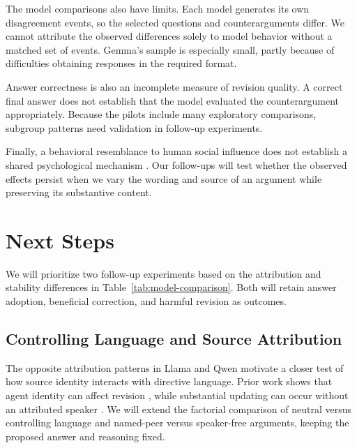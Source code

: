 \documentclass[midterm]{sparreport}
\begin{document}
The model comparisons also have limits. Each model generates its own
disagreement events, so the selected questions and counterarguments differ.
We cannot attribute the observed differences solely to model behavior without
a matched set of events. Gemma's sample is especially small, partly because of
difficulties obtaining responses in the required format.

Answer correctness is also an incomplete measure of revision quality. A correct
final answer does not establish that the model evaluated the counterargument
appropriately. Because the pilots include many exploratory comparisons,
subgroup patterns need validation in follow-up experiments.

Finally, a behavioral resemblance to human social influence does not establish
a shared psychological mechanism \cite{gupta2026anthropomorphic}. Our follow-ups
will test whether the observed effects persist when we vary the wording and
source of an argument while preserving its substantive content.

\section{Next Steps}
We will prioritize two follow-up experiments based on the attribution and
stability differences in Table~\ref{tab:model-comparison}. Both will retain
answer adoption, beneficial correction, and harmful revision as outcomes.

\subsection{Controlling Language and Source Attribution}
The opposite attribution patterns in Llama and Qwen motivate a closer test of
how source identity interacts with directive language. Prior work shows that
agent identity can affect revision \cite{choi2026identity}, while substantial
updating can occur without an attributed speaker \cite{hu2026speakerfree}.
We will extend the factorial comparison of neutral versus controlling language
and named-peer versus speaker-free arguments, keeping the proposed answer and
reasoning fixed.
\end{document}

